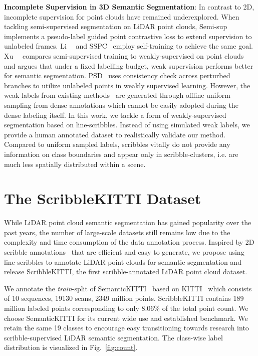 \documentclass[10pt,twocolumn,letterpaper]{article}
\begin{document}
\noindent \textbf{Incomplete Supervision in 3D Semantic Segmentation}: 
In contrast to 2D, incomplete supervision for point clouds have remained underexplored.
When tackling semi-supervised segmentation on LiDAR point clouds, Semi-sup~\cite{iccv2021guided} implements a pseudo-label guided point contrastive loss to extend supervision to unlabeled frames. Li~\etal~\cite{nc2021semi} and SSPC~\cite{arxiv2021sspc} employ self-training to achieve the same goal. Xu~\etal~\cite{cvpr2020towards10x} compares semi-supervised training to weakly-supervised on point clouds and argues that under a fixed labelling budget, weak supervision performs better for semantic segmentation. PSD~\cite{iccv2021selfdistillation} uses consistency check across perturbed branches to utilize unlabeled points in weakly supervised learning. However, the weak labels from existing methods~\cite{cvpr2020towards10x,iccv2021selfdistillation} are generated through offline uniform sampling from dense annotations which cannot be easily adopted during the dense labeling itself.
In this work, we tackle a form of weakly-supervised segmentation based on line-scribbles. Instead of using simulated weak labels, we provide a human annotated dataset to realistically validate our method. Compared to uniform sampled labels, scribbles vitally do not provide any information on class boundaries and appear only in scribble-clusters, i.e. are much less spatially distributed within a scene.

\nocite{tang2018regularized}
\nocite{liu2021unbiased}

\section{The ScribbleKITTI Dataset}

While LiDAR point cloud semantic segmentation has gained popularity over the past years, the number of large-scale datasets still remains low due to the complexity and time consumption of the data annotation process. Inspired by 2D scribble annotations~\cite{cvpr2016scribblesup} that are efficient and easy to generate, we propose using line-scribbles to annotate LiDAR point clouds for semantic segmentation and release ScribbleKITTI, the first scribble-annotated LiDAR point cloud dataset.

We annotate the \textit{train}-split of SemanticKITTI~\cite{iccv2019semantickitti} based on KITTI~\cite{ijrr2013kitti} which consists of 10 sequences, 19130 scans, 2349 million points. ScribbleKITTI contains 189 million labeled points corresponding to only 8.06\% of the total point count. We choose SemanticKITTI for its current wide use and established benchmark. We retain the same 19 classes to encourage easy transitioning towards research into scribble-supervised LiDAR semantic segmentation. The class-wise label distribution is visualized in Fig.~\ref{fig:count}.
\end{document}
